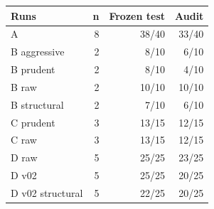 \begin{tabular}{lrrr}
\toprule
Runs & n & Frozen test & Audit \\
\midrule
A & 8 & 38/40 & 33/40 \\
B aggressive & 2 & 8/10 & 6/10 \\
B prudent & 2 & 8/10 & 4/10 \\
B raw & 2 & 10/10 & 10/10 \\
B structural & 2 & 7/10 & 6/10 \\
C prudent & 3 & 13/15 & 12/15 \\
C raw & 3 & 13/15 & 12/15 \\
D raw & 5 & 25/25 & 23/25 \\
D v02 & 5 & 25/25 & 20/25 \\
D v02 structural & 5 & 22/25 & 20/25 \\
\bottomrule
\end{tabular}
